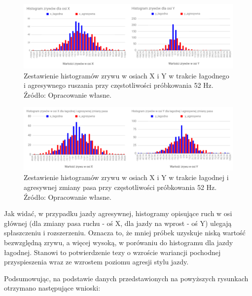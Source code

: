 \begin{figure}[H]
	\centering
	\includegraphics[width=16cm]{img/driving_analysis/histogram_zestawienie_ostre_lagodne_ruszanie.png}
	\caption{Zestawienie histogramów zrywu w osiach X i Y w trakcie łagodnego i agresywnego ruszania przy częstotliwości próbkowania 52 Hz.
	\\Źródło: Opracowanie własne.}
	\label{fig:image_histogram_acceleration_52Hz}
\end{figure}

\begin{figure}[H]
	\centering
	\includegraphics[width=16cm]{img/driving_analysis/histogram_zestawienie_zmiana_pasa.png}
	\caption{Zestawienie histogramów zrywu w osiach X i Y w trakcie łagodnej i agresywnej zmiany pasa przy częstotliwości próbkowania 52 Hz.
	\\Źródło: Opracowanie własne.}
	\label{fig:image_histogram_changing_lane_52Hz}
\end{figure}

Jak widać, w przypadku jazdy agresywnej, histogramy opisujące ruch w osi głównej (dla zmiany pasa ruchu - oś X, dla jazdy na wprost - oś Y) ulegają spłaszczeniu i rozszerzeniu. Oznacza to, że mniej próbek uzyskuje niską wartość bezwzględną zrywu, a więcej wysoką, w porówaniu do histogramu dla jazdy łagodnej. Stanowi to potwierdzenie tezy o wzroście wariancji pochodnej przyspieszenia wraz ze wzrostem poziomu agresji stylu jazdy.

Podsumowując, na podstawie danych przedstawionych na powyższych rysunkach otrzymano następujące wnioski:

